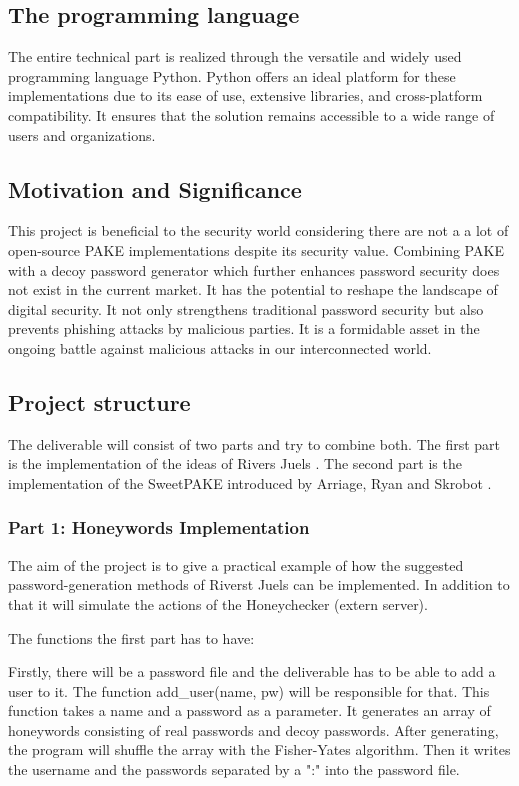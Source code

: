 \documentclass[conference,compsoc]{IEEEtran}
\begin{document}
\subsection{The programming language} The entire technical part is realized
through the versatile and widely used programming language Python. Python
offers an ideal platform for these implementations due to its ease of use,
extensive libraries, and cross-platform compatibility. It ensures that the
solution remains accessible to a wide range of users and organizations.

\subsection{Motivation and Significance} This project is beneficial to the
security world considering there are not a a lot of open-source PAKE
implementations despite its security value. Combining PAKE with a decoy
password generator which further enhances password security does not exist in
the current market. It has the potential to reshape the landscape of digital
security. It not only strengthens traditional password security but also
prevents phishing attacks by malicious parties. It is a formidable asset in the
ongoing battle against malicious attacks in our interconnected world.

\subsection{Project structure} The deliverable will consist of two parts and
try to combine both. The first part is the implementation of the ideas of
Rivers Juels \cite{juels2013honeywords}. The second part is the implementation
of the SweetPAKE introduced by Arriage, Ryan and Skrobot \cite{sweetpake}. 

\subsubsection{Part 1: Honeywords Implementation} The aim of the project is to
give a practical example of how the suggested password-generation methods of
Riverst Juels can be implemented. In addition to that it will simulate the
actions of the Honeychecker (extern server).

The functions the first part has to have:

Firstly, there will be a password file and the deliverable has to be able to
add a user to it. The function add\_user(name, pw) will be responsible for
that. This function takes a name and a password as a parameter. It generates an
array of honeywords consisting of real passwords and decoy passwords. After
generating, the program will shuffle the array with the Fisher-Yates algorithm.
Then it writes the username and the passwords separated by a ":" into the
password file.
\end{document}
